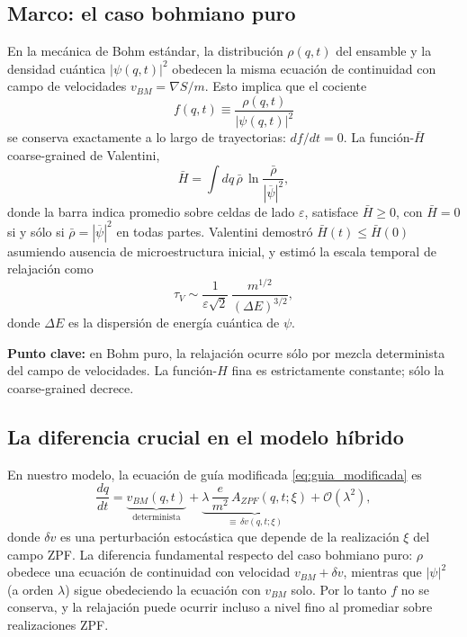 \documentclass[11pt,a4paper]{article}
\begin{document}
\subsection{Marco: el caso bohmiano puro}
\label{sec:bohm_puro}

En la mecánica de Bohm estándar, la distribución $\rho(q,t)$ del ensamble
y la densidad cuántica $|\psi(q,t)|^2$ obedecen la misma ecuación de
continuidad con campo de velocidades $v_{BM}=\nabla S/m$. Esto implica
que el cociente
\begin{equation}
f(q,t) \equiv \frac{\rho(q,t)}{|\psi(q,t)|^2}
\label{eq:cociente_f}
\end{equation}
se conserva exactamente a lo largo de trayectorias: $df/dt=0$. La
función-$\bar{H}$ coarse-grained de Valentini,
\begin{equation}
\bar{H} = \int dq\,\bar{\rho}\,\ln\frac{\bar{\rho}}{|\overline{\psi}|^2},
\label{eq:hbar_def}
\end{equation}
donde la barra indica promedio sobre celdas de lado $\varepsilon$,
satisface $\bar{H}\geq 0$, con $\bar{H}=0$ si y sólo si
$\bar{\rho}=|\overline{\psi}|^2$ en todas partes. Valentini demostró
$\bar{H}(t)\leq \bar{H}(0)$ asumiendo ausencia de microestructura
inicial, y estimó la escala temporal de relajación como
\begin{equation}
\tau_V \sim \frac{1}{\varepsilon\sqrt{2}}\,
\frac{m^{1/2}}{(\Delta E)^{3/2}},
\label{eq:tauV}
\end{equation}
donde $\Delta E$ es la dispersión de energía cuántica de $\psi$.

\textbf{Punto clave:} en Bohm puro, la relajación ocurre sólo por mezcla
determinista del campo de velocidades. La función-$H$ fina es
estrictamente constante; sólo la coarse-grained decrece.

\subsection{La diferencia crucial en el modelo híbrido}
\label{sec:diferencia_hibrido}

En nuestro modelo, la ecuación de guía modificada
\eqref{eq:guia_modificada} es
\begin{equation}
\frac{dq}{dt} = \underbrace{v_{BM}(q,t)}_{\text{determinista}}
+ \underbrace{\lambda\,\frac{e}{m^2}\,A_{ZPF}(q,t;\xi)}_{\equiv\,\delta v(q,t;\xi)}
+\mathcal{O}(\lambda^2),
\label{eq:guia_estocastica}
\end{equation}
donde $\delta v$ es una perturbación estocástica que depende de la
realización $\xi$ del campo ZPF. La diferencia fundamental respecto del
caso bohmiano puro: $\rho$ obedece una ecuación de continuidad con
velocidad $v_{BM}+\delta v$, mientras que $|\psi|^2$ (a orden $\lambda$)
sigue obedeciendo la ecuación con $v_{BM}$ solo. Por lo tanto $f$ no se
conserva, y la relajación puede ocurrir incluso a nivel fino al
promediar sobre realizaciones ZPF.
\end{document}
